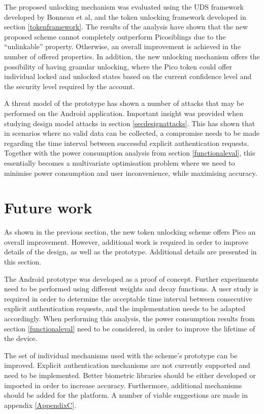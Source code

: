 The proposed unlocking mechanism was evaluated using the UDS framework developed by Bonneau et al, and the token unlocking framework developed in section \ref{tokenframework}. The results of the analysis have shown that the new proposed scheme cannot completely outperform Picosiblings due to the ``unlinkable'' property. Otherwise, an overall improvement is achieved in the number of offered properties. In addition, the new unlocking mechanism offers the possibility of having granular unlocking, where the Pico token could offer individual locked and unlocked states based on the current confidence level and the security level required by the account.

A threat model of the prototype has shown a number of attacks that may be performed on the Android application. Important insight was provided when studying design model attacks in section \ref{secdesignattacks}. This has shown that in scenarios where no valid data can be collected, a compromise needs to be made regarding the time interval between successful explicit authentication requests. Together with the power consumption analysis from section \ref{functionaleval}, this essentially becomes a multivariate optimisation problem where we need to minimise power consumption and user inconvenience, while maximising accuracy.

\section*{Future work}
As shown in the previous section, the new token unlocking scheme offers Pico an overall improvement. However, additional work is required in order to improve details of the design, as well as the prototype. Additional details are presented in this section. 

The Android prototype was developed as a proof of concept. Further experiments need to be performed using different weights and decay functions. A user study is required in order to determine the acceptable time interval between consecutive explicit authentication requests, and the implementation needs to be adapted accordingly. When performing this analysis, the power consumption results from section \ref{functionaleval} need to be considered, in order to improve the lifetime of the device.

The set of individual mechanisms used with the scheme's prototype can be improved. Explicit authentication mechanisms are not currently supported and need to be implemented. Better biometric libraries should be either developed or imported in order to increase accuracy. Furthermore, additional mechanisms should be added for the platform. A number of viable suggestions are made in appendix \ref{AppendixC}.

